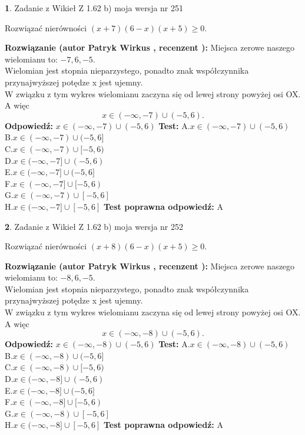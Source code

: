 \documentclass[12pt, a4paper]{article}
\theoremstyle{definition} %
\newtheorem{zad}{}
\newcommand{\zadStart}[1]{\begin{zad}#1\newline}
\newcommand{\zadStop}{\end{zad}}
\newcommand{\rozwStart}[2]{\noindent \textbf{Rozwiązanie (autor #1 , recenzent #2): }\newline}
\newcommand{\rozwStop}{\newline}
\newcommand{\odpStart}{\noindent \textbf{Odpowiedź:}\newline}
\newcommand{\odpStop}{\newline}
\newcommand{\testStart}{\noindent \textbf{Test:}\newline}
\newcommand{\testStop}{\newline}
\newcommand{\kluczStart}{\noindent \textbf{Test poprawna odpowiedź:}\newline}
\newcommand{\kluczStop}{\newline}
\begin{document}
\zadStart{Zadanie z Wikieł Z 1.62 b) moja wersja nr 251}

Rozwiązać nierówności $(x+7)(6-x)(x+5)\ge0$.
\zadStop
\rozwStart{Patryk Wirkus}{}
Miejsca zerowe naszego wielomianu to: $-7, 6, -5$.\\
Wielomian jest stopnia nieparzystego, ponadto znak współczynnika przy\linebreak najwyższej potędze x jest ujemny.\\ W związku z tym wykres wielomianu zaczyna się od lewej strony powyżej osi OX. A więc $$x \in (-\infty,-7) \cup (-5,6).$$
\rozwStop
\odpStart
$x \in (-\infty,-7) \cup (-5,6)$
\odpStop
\testStart
A.$x \in (-\infty,-7) \cup (-5,6)$\\
B.$x \in (-\infty,-7) \cup (-5,6]$\\
C.$x \in (-\infty,-7) \cup [-5,6)$\\
D.$x \in (-\infty,-7] \cup (-5,6)$\\
E.$x \in (-\infty,-7] \cup (-5,6]$\\
F.$x \in (-\infty,-7] \cup [-5,6)$\\
G.$x \in (-\infty,-7) \cup [-5,6]$\\
H.$x \in (-\infty,-7] \cup [-5,6]$
\testStop
\kluczStart
A
\kluczStop



\zadStart{Zadanie z Wikieł Z 1.62 b) moja wersja nr 252}

Rozwiązać nierówności $(x+8)(6-x)(x+5)\ge0$.
\zadStop
\rozwStart{Patryk Wirkus}{}
Miejsca zerowe naszego wielomianu to: $-8, 6, -5$.\\
Wielomian jest stopnia nieparzystego, ponadto znak współczynnika przy\linebreak najwyższej potędze x jest ujemny.\\ W związku z tym wykres wielomianu zaczyna się od lewej strony powyżej osi OX. A więc $$x \in (-\infty,-8) \cup (-5,6).$$
\rozwStop
\odpStart
$x \in (-\infty,-8) \cup (-5,6)$
\odpStop
\testStart
A.$x \in (-\infty,-8) \cup (-5,6)$\\
B.$x \in (-\infty,-8) \cup (-5,6]$\\
C.$x \in (-\infty,-8) \cup [-5,6)$\\
D.$x \in (-\infty,-8] \cup (-5,6)$\\
E.$x \in (-\infty,-8] \cup (-5,6]$\\
F.$x \in (-\infty,-8] \cup [-5,6)$\\
G.$x \in (-\infty,-8) \cup [-5,6]$\\
H.$x \in (-\infty,-8] \cup [-5,6]$
\testStop
\kluczStart
A
\kluczStop
\end{document}
